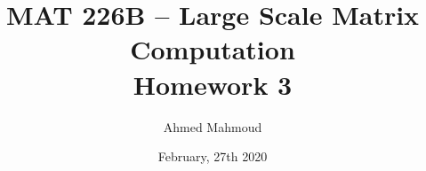 \documentclass[12pt] {article}
\begin{document}
\title{MAT 226B – Large Scale Matrix Computation \\ Homework 3}
\author{Ahmed Mahmoud}
\date{February, 27th 2020} 

\maketitle











\end{document}
